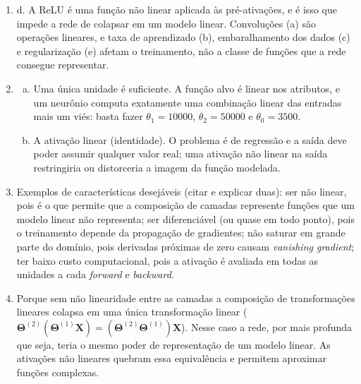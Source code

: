 \documentclass{dlproblemset}
\begin{document}
\begin{enumerate}[1)]
    \item d. A ReLU é uma função não linear aplicada às pré-ativações, e é isso que impede a rede de colapsar em um modelo linear. Convoluções (a) são operações lineares, e taxa de aprendizado (b), embaralhamento dos dados (c) e regularização (e) afetam o treinamento, não a classe de funções que a rede consegue representar.

    \item
    \begin{enumerate}[(a)]
        \item Uma única unidade é suficiente. A função alvo é linear nos atributos, e um neurônio computa exatamente uma combinação linear das entradas mais um viés: basta fazer $\theta_1 = 10000$, $\theta_2 = 50000$ e $\theta_0 = 3500$.
        \item A ativação linear (identidade). O problema é de regressão e a saída deve poder assumir qualquer valor real; uma ativação não linear na saída restringiria ou distorceria a imagem da função modelada.
    \end{enumerate}

    \item Exemplos de características desejáveis (citar e explicar duas): ser não linear, pois é o que permite que a composição de camadas represente funções que um modelo linear não representa; ser diferenciável (ou quase em todo ponto), pois o treinamento depende da propagação de gradientes; não saturar em grande parte do domínio, pois derivadas próximas de zero causam \textit{vanishing gradient}; ter baixo custo computacional, pois a ativação é avaliada em todas as unidades a cada \textit{forward} e \textit{backward}.

    \item Porque sem não linearidade entre as camadas a composição de transformações lineares colapsa em uma única transformação linear ($\mathbf{\Theta}^{(2)}(\mathbf{\Theta}^{(1)} \mathbf{X}) = (\mathbf{\Theta}^{(2)}\mathbf{\Theta}^{(1)})\mathbf{X}$). Nesse caso a rede, por mais profunda que seja, teria o mesmo poder de representação de um modelo linear. As ativações não lineares quebram essa equivalência e permitem aproximar funções complexas.


\end{enumerate}
\end{document}
